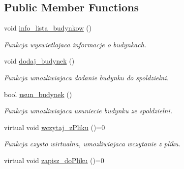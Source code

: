 \subsection*{Public Member Functions}
\begin{DoxyCompactItemize}
\item 
\hypertarget{class_zarzadzanie__budynkami_ab0b3dbe88dc6ff684c15ec8438b51fc0}{}void \hyperlink{class_zarzadzanie__budynkami_ab0b3dbe88dc6ff684c15ec8438b51fc0}{info\+\_\+lista\+\_\+budynkow} ()\label{class_zarzadzanie__budynkami_ab0b3dbe88dc6ff684c15ec8438b51fc0}

\begin{DoxyCompactList}\small\item\em Funkcja wyswietlajaca informacje o budynkach. \end{DoxyCompactList}\item 
\hypertarget{class_zarzadzanie__budynkami_ab09c3e96b0877301050216f15affdd73}{}void \hyperlink{class_zarzadzanie__budynkami_ab09c3e96b0877301050216f15affdd73}{dodaj\+\_\+budynek} ()\label{class_zarzadzanie__budynkami_ab09c3e96b0877301050216f15affdd73}

\begin{DoxyCompactList}\small\item\em Funkcja umozliwiajaca dodanie budynku do spoldzielni. \end{DoxyCompactList}\item 
\hypertarget{class_zarzadzanie__budynkami_a20ae1255c7169fe8643f507cdab248a9}{}bool \hyperlink{class_zarzadzanie__budynkami_a20ae1255c7169fe8643f507cdab248a9}{usun\+\_\+budynek} ()\label{class_zarzadzanie__budynkami_a20ae1255c7169fe8643f507cdab248a9}

\begin{DoxyCompactList}\small\item\em Funkcja umozliwiajaca usuniecie budynku ze spoldzielni. \end{DoxyCompactList}\item 
\hypertarget{class_zarzadzanie__budynkami_aab94959cc237230127359a77aad3927f}{}virtual void \hyperlink{class_zarzadzanie__budynkami_aab94959cc237230127359a77aad3927f}{wczytaj\+\_\+z\+Pliku} ()=0\label{class_zarzadzanie__budynkami_aab94959cc237230127359a77aad3927f}

\begin{DoxyCompactList}\small\item\em Funkcja czysto wirtualna, umozliwiajaca wczytanie z pliku. \end{DoxyCompactList}\item 
\hypertarget{class_zarzadzanie__budynkami_a377271389f7fae1d2e99f31a7a9b2de1}{}virtual void \hyperlink{class_zarzadzanie__budynkami_a377271389f7fae1d2e99f31a7a9b2de1}{zapisz\+\_\+do\+Pliku} ()=0\label{class_zarzadzanie__budynkami_a377271389f7fae1d2e99f31a7a9b2de1}


\end{DoxyCompactItemize}
